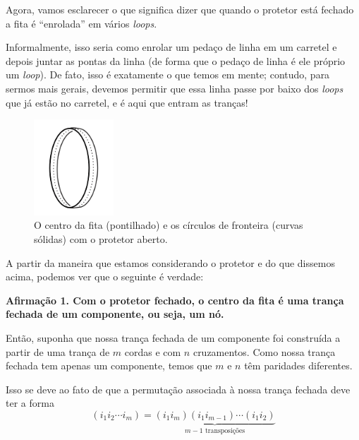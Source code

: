 	\par\vspace{0.3cm} Agora, vamos esclarecer o que significa dizer que quando o protetor está fechado a fita é ``enrolada'' em vários \textit{loops}.
	\par\vspace{0.3cm} Informalmente, isso seria como enrolar um pedaço de linha em um carretel e depois juntar as pontas da linha (de forma que o pedaço de linha é ele próprio um \textit{loop}). De fato, isso é exatamente o que temos em mente; contudo, para sermos mais gerais, devemos permitir que essa linha passe por baixo dos \textit{loops} que já estão no carretel, e é aqui que entram as tranças! 
	\begin{figure}[H]
		\begin{center}
			\includegraphics[width=3cm]{Images/fita.png}
		\end{center}\caption{O centro da fita (pontilhado) e os círculos de fronteira (curvas sólidas) com o protetor aberto.}
	\end{figure}
	\par\vspace{0.3cm} A partir da maneira que estamos considerando o protetor e do que dissemos acima, podemos ver que o seguinte é verdade:
	\begin{center}
		\textbf{Afirmação 1. Com o protetor fechado, o centro da fita é uma trança fechada de um componente, ou seja, um nó.}
	\end{center}
	\par\vspace{0.3cm} Então, suponha que nossa trança fechada de um componente foi construída a partir de uma trança de $m$ cordas e com $n$ cruzamentos. Como nossa trança fechada tem apenas um componente, temos que $m$ e $n$ têm paridades diferentes.
	\par\vspace{0.3cm} Isso se deve ao fato de que a permutação associada à nossa trança fechada deve ter a forma
	\begin{equation*}
	(i_1i_2\cdots i_m) = \underbrace{(i_1i_m)(i_1i_{m-1})\cdots(i_1i_2)}_{m-1\text{ transposições}}
	\end{equation*}
